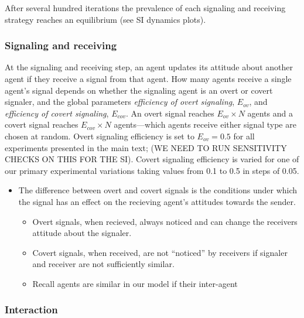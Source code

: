 \documentclass[11pt,letterpaper]{article}
\begin{document}
After several hundred iterations the prevalence of each signaling and
receiving strategy reaches an equilibrium (see SI dynamics plots). 


\subsubsection{Signaling and receiving}

At the signaling and receiving step, an agent updates its attitude about another
agent if they receive a signal from that agent. How many agents receive a
single agent's signal depends on whether the signaling agent is an overt or
covert signaler, and the global parameters \emph{efficiency of overt signaling}, $E_{ov}$,
and \emph{efficiency of covert signaling}, $E_{cov}$. An overt signal reaches
$E_{ov} \times N$ agents and a covert signal reaches $E_{cov} \times N$ 
agents---which agents receive either signal type are chosen at random.
Overt signaling efficiency is set to $E_{ov}=0.5$ for all experiments presented
in the main text; (WE NEED TO RUN SENSITIVITY CHECKS ON THIS FOR THE SI). Covert
signaling efficiency is varied for one of our primary experimental variations
taking values from 0.1 to 0.5 in steps of 0.05. 

\begin{itemize}
  \item The difference between overt and covert signals is the conditions
    under which the signal has an effect on the recieving agent's attitudes
    towards the sender.
    \begin{itemize}
      \item Overt signals, when recieved, always noticed and can change the
        receivers attitude about the signaler.
      \item Covert signals, when received, are not ``noticed'' by receivers
        if signaler and receiver are not sufficiently similar. 
      \item Recall agents are similar in our model if their inter-agent
    \end{itemize}
\end{itemize}

\subsubsection{Interaction}
\end{document}
